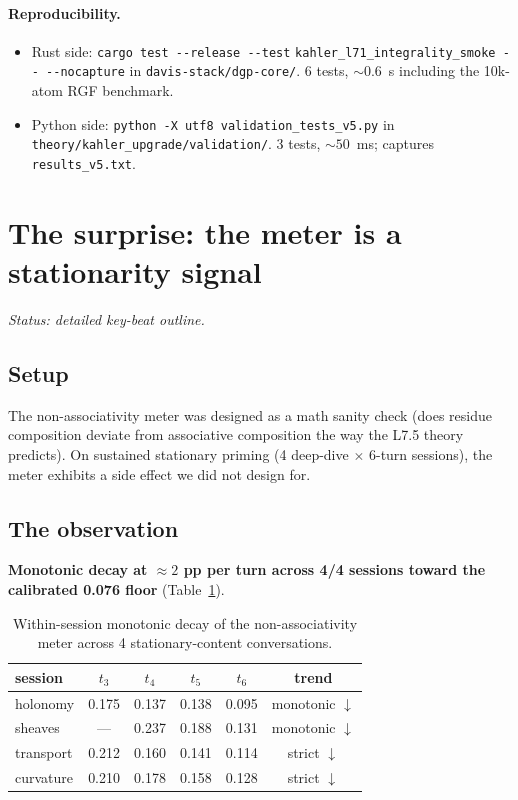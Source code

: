 \documentclass[11pt,letterpaper]{article}
\begin{document}
\paragraph{Reproducibility.}
\begin{itemize}[nosep]
\item Rust side: \verb|cargo test --release --test|
  \verb|kahler_l71_integrality_smoke -- --nocapture| in
  \texttt{davis-stack/dgp-core/}. 6 tests, $\sim 0.6$~s including
  the 10k-atom RGF benchmark.
\item Python side: \verb|python -X utf8 validation_tests_v5.py| in
  \texttt{theory/kahler\_upgrade/validation/}. 3 tests,
  $\sim 50$~ms; captures \texttt{results\_v5.txt}.
\end{itemize}


\section{The surprise: the meter is a stationarity signal}
\label{sec:surprise}

\noindent\emph{Status: detailed key-beat outline.}

\subsection{Setup}

The non-associativity meter was designed as a math sanity check (does
residue composition deviate from associative composition the way the
L7.5 theory predicts). On sustained stationary priming (4 deep-dive
$\times$ 6-turn sessions), the meter exhibits a side effect we did
not design for.

\subsection{The observation}

\textbf{Monotonic decay at $\approx 2$ pp per turn across 4/4
sessions toward the calibrated 0.076 floor}
(Table~\ref{tab:stationarity}).

\begin{table}[h]
\centering
\begin{tabular}{lccccc}
\toprule
session    & $t_3$ & $t_4$ & $t_5$ & $t_6$ & trend \\
\midrule
holonomy   & 0.175 & 0.137 & 0.138 & 0.095 & monotonic $\downarrow$ \\
sheaves    & ---   & 0.237 & 0.188 & 0.131 & monotonic $\downarrow$ \\
transport  & 0.212 & 0.160 & 0.141 & 0.114 & strict $\downarrow$ \\
curvature  & 0.210 & 0.178 & 0.158 & 0.128 & strict $\downarrow$ \\
\bottomrule
\end{tabular}
\caption{Within-session monotonic decay of the non-associativity
meter across 4 stationary-content conversations.}
\label{tab:stationarity}
\end{table}
\end{document}
